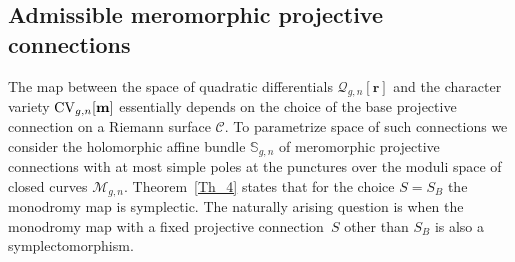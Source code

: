 \documentclass[pdftex]{sigma}
\numberwithin{equation}{section}
\theoremstyle{definition}
\begin{document}
\subsection{Admissible meromorphic projective connections}
The map between the space of quadratic differentials $\mathcal{Q}_{g,n}[\mathbf{r}]$ and the character variety ${\rm CV}_{g,n}[\mathbf{m}]$ essentially depends on the choice of the base projective connection on a Riemann surface $\mathcal{C}.$ To parametrize space of such connections we consider the holomorphic affine bundle $\mathbb{S}_{g,n}$ of meromorphic projective connections with at most simple poles at the punctures over the moduli space of closed curves $\mathcal{M}_{g,n}$. Theorem~\ref{Th_4} states that for the choice $S=S_B$ the monodromy map is symplectic. The naturally arising question is when the monodromy map with a fixed projective connection~$S$ other than $S_B$ is also a symplectomorphism.
\end{document}
